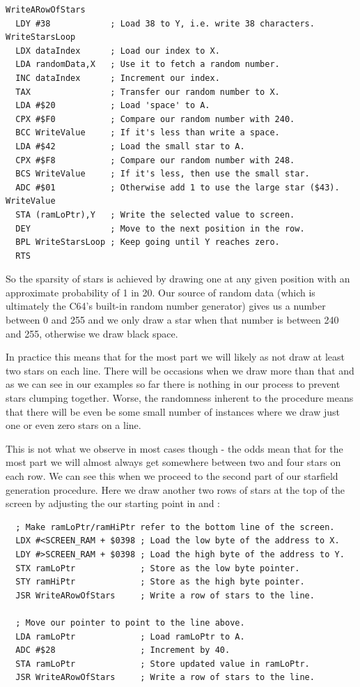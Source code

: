\begin{lstlisting}
WriteARowOfStars
  LDY #38            ; Load 38 to Y, i.e. write 38 characters.
WriteStarsLoop
  LDX dataIndex      ; Load our index to X.
  LDA randomData,X   ; Use it to fetch a random number.
  INC dataIndex      ; Increment our index.
  TAX                ; Transfer our random number to X.
  LDA #$20           ; Load 'space' to A.
  CPX #$F0           ; Compare our random number with 240.
  BCC WriteValue     ; If it's less than write a space.
  LDA #$42           ; Load the small star to A.
  CPX #$F8           ; Compare our random number with 248.
  BCS WriteValue     ; If it's less, then use the small star. 
  ADC #$01           ; Otherwise add 1 to use the large star ($43).
WriteValue
  STA (ramLoPtr),Y   ; Write the selected value to screen.
  DEY                ; Move to the next position in the row.
  BPL WriteStarsLoop ; Keep going until Y reaches zero.
  RTS
\end{lstlisting}

So the sparsity of stars is achieved by drawing one at any given position with an approximate probability of 1 in 20. Our source of random data (which is ultimately
the C64's built-in random number generator) gives us a number between 0 and 255 and we only draw a star when that number is
between 240 and 255, otherwise we draw black space. 

In practice this means that for the most part we will likely as not draw at least two stars on each line. There will be occasions when we
draw more than that and as we can see in our examples so far there is nothing in our process to prevent stars clumping together. Worse,
the randomness inherent to the procedure means that there will be even be some small number of instances where we draw just one or even zero stars on a line.

This is not what we observe in most cases though - the odds mean that for the most part we will almost always get somewhere between two and
four stars on each row. We can see this when we proceed to the second part of our starfield generation procedure. Here we draw another two rows
of stars at the top of the screen by adjusting the our starting point in  and :

\begin{lstlisting}
  ; Make ramLoPtr/ramHiPtr refer to the bottom line of the screen.
  LDX #<SCREEN_RAM + $0398 ; Load the low byte of the address to X.
  LDY #>SCREEN_RAM + $0398 ; Load the high byte of the address to Y.
  STX ramLoPtr             ; Store as the low byte pointer.
  STY ramHiPtr             ; Store as the high byte pointer.
  JSR WriteARowOfStars     ; Write a row of stars to the line.

  ; Move our pointer to point to the line above.
  LDA ramLoPtr             ; Load ramLoPtr to A.
  ADC #$28                 ; Increment by 40.
  STA ramLoPtr             ; Store updated value in ramLoPtr.
  JSR WriteARowOfStars     ; Write a row of stars to the line.
\end{lstlisting}

